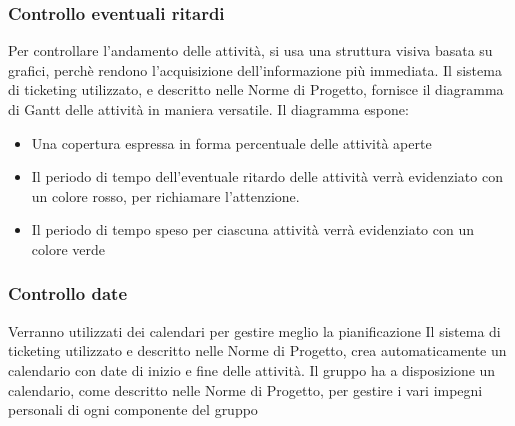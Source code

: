 \subsubsection{Controllo eventuali ritardi}
Per controllare l'andamento delle attività, si usa una struttura visiva basata su grafici, perchè rendono l'acquisizione dell'informazione più immediata.
Il sistema di ticketing utilizzato, e descritto nelle Norme di Progetto, fornisce il diagramma di Gantt delle attività in maniera versatile. Il diagramma espone:
\begin{itemize}
\item Una copertura espressa in forma percentuale delle attività aperte
\item Il periodo di tempo dell'eventuale ritardo delle attività verrà evidenziato con un colore rosso, per richiamare l'attenzione.
\item Il periodo di tempo speso per ciascuna attività verrà evidenziato con un colore verde
\end{itemize}
\subsubsection{Controllo date}
Verranno utilizzati dei calendari per gestire meglio la pianificazione
Il sistema di ticketing utilizzato e descritto nelle Norme di Progetto, crea automaticamente un calendario con date di inizio e fine delle attività.
Il gruppo ha a disposizione un calendario, come descritto nelle Norme di Progetto, per gestire i vari impegni personali di ogni componente del gruppo
